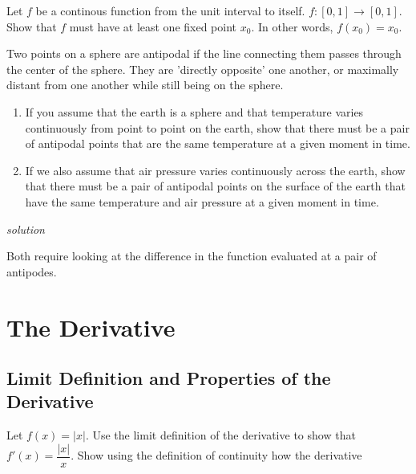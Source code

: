 \documentclass{amsbook}
\begin{document}
\begin{Exercise}[title={Fixed points}, difficulty=1, label=2d2]
Let $f$ be a continous function from the unit interval to itself. $f:[0,1] \to [0,1]$. Show that $f$ must have at least one fixed point $x_0$.  In other words,  $f(x_0)=x_0$.

\end{Exercise}

\begin{Exercise}[title={Antipodes}, difficulty = 2, label=2d3]
Two points on a sphere are antipodal if the line connecting them passes through the center of the sphere. They are 'directly opposite' one another, or maximally distant from one another while still being on the sphere. 
	\begin{enumerate}
		\item If you assume that the earth is a sphere and that temperature varies continuously from point to point on the earth, show that there must be a pair of antipodal points that are the same temperature at a given moment in time.\\
		\item If we also assume that air pressure varies continuously across the earth, show that there must be a pair of antipodal points on the surface of the earth that have the same temperature and air pressure at a given moment in time. \\
	\end{enumerate}
\hfill \emph{solution} 
\end{Exercise}

\begin{Answer}[ref={2d3}]
	Both require looking at the difference in the function evaluated at a pair of antipodes.
\end{Answer}


\chapter{The Derivative}

\section{Limit Definition and Properties of the Derivative}
\begin{Exercise}[title={Introducing a Discontinuity}, difficulty=0, label=3a1]
Let $f(x)=|x|$. Use the limit definition of the derivative to show that $f'(x)=\dfrac{|x|}{x}$. Show using the definition of continuity how the derivative 

\end{Exercise}
\end{document}
